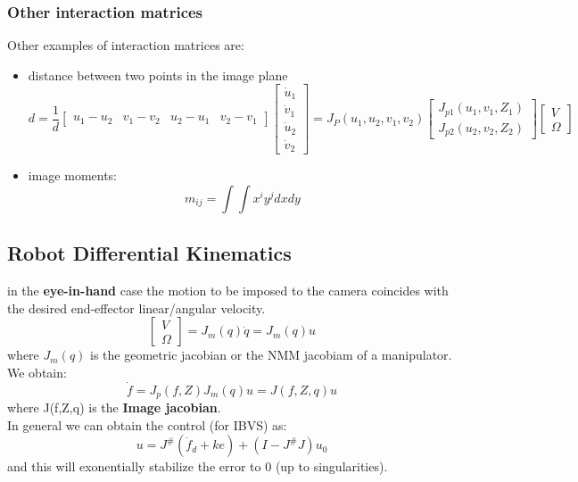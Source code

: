 \documentclass[a4paper,12pt]{article}
\begin{document}
\subsubsection{Other interaction matrices}
Other examples of interaction matrices are:\begin{itemize}
\item distance between two points in the image plane \begin{equation}
d=\frac{1}{d}\begin{bmatrix}
    u_1-u_2 & v_1-v_2 & u_2- u_1 & v_2-v_1 
\end{bmatrix}\begin{bmatrix}
    \dot{u}_1 \\
    \dot{v}_1 \\
    \dot{u}_2 \\
    \dot{v}_2
\end{bmatrix}
= J_P(u_1,u_2,v_1,v_2) \begin{bmatrix}
J_{p1}(u_1,v_1,Z_1) \\
J_{p2}(u_2,v_2,Z_2)
\end{bmatrix} 
\begin{bmatrix}
V\\
\Omega
\end{bmatrix}
\end{equation}
\item image moments:\begin{equation}
m_{ij}=\int \int x^i y^j dxdy
\end{equation}
\end{itemize}
\subsection{Robot Differential Kinematics}
in the \textbf{eye-in-hand} case the motion to be imposed to 
the camera coincides with the desired end-effector 
linear/angular velocity.
\begin{equation}
\begin{bmatrix}
    V\\
    \Omega
\end{bmatrix}=J_m(q)\dot{q}=J_m(q)u
\end{equation}
where $J_m(q)$ is the geometric jacobian or the NMM jacobiam of 
a manipulator.\\
We obtain: \begin{equation}
\dot{f}=J_p(f,Z)J_m(q)u=J(f,Z,q)u
\end{equation}
where J(f,Z,q) is the \textbf{Image jacobian}.\\
In general we can obtain the control (for IBVS) as: \begin{equation}
u=J^{\#}(\dot{f}_d+ke)+(I-J^{\#}J)u_0
\end{equation}
and this will exonentially stabilize the error to 0 (up to singularities).
\end{document}
